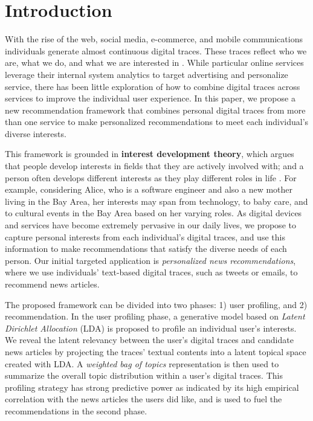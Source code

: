 \documentclass[conference]{IEEEtran}
\begin{document}
\section{Introduction}
With the rise of the web, social media, e-commerce, and mobile communications individuals generate almost continuous digital traces. These traces reflect who we are, what we do, and what we are interested in \cite{Estrin:2014:SDN}. While particular online services leverage their internal system analytics to target advertising and personalize service, there has been little exploration of how to combine digital traces across services to improve the individual user experience. In this paper, we propose a new recommendation framework that combines personal digital traces from more than one service to make personalized recommendations to meet each individual's diverse interests.

This framework is grounded in \textbf{interest development theory}, which argues that people develop interests in fields that they are actively involved with; and a person often develops different interests as they play different roles in life \cite{hofer2010adolescents}. For example, considering Alice, who is a software engineer and also a new mother living in the Bay Area, her interests may span from technology, to baby care, and to cultural events in the Bay Area based on her varying roles. As digital devices and services have become extremely pervasive in our daily lives, we propose to capture personal interests from each individual's digital traces, and use this information to make recommendations that satisfy the diverse needs of each person. Our initial targeted application is \textit{personalized news recommendations}, where we use individuals' text-based digital traces, such as tweets or emails, to recommend news articles. 



The proposed framework can be divided into two phases: 1) user profiling, and 2) recommendation. In the user profiling phase, a generative model based on \textit{Latent Dirichlet Allocation} (LDA) is proposed to profile an individual user's interests. We reveal the latent relevancy between the user's digital traces and candidate news articles by projecting the traces' textual contents into a latent topical space created with LDA. A \textit{weighted bag of topics} representation is then used to summarize the overall topic distribution within a user's digital traces. This profiling strategy has strong predictive power as indicated by its high empirical correlation with the news articles the users did like, and is used to fuel the recommendations in the second phase. 
\end{document}
